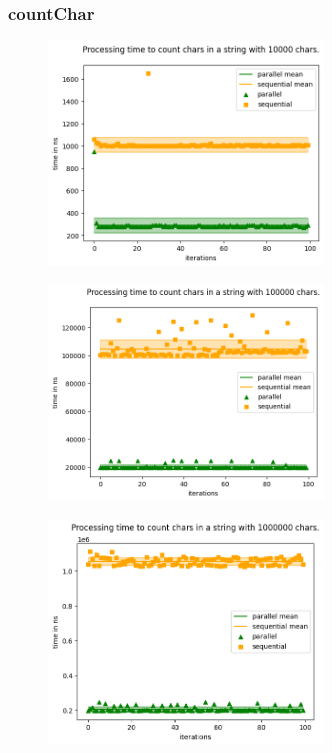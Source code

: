 \documentclass[plainarticle,zihtitle,german,final,hyperref,utf8]{zihpub}
\begin{document}
\subsubsection{countChar}
\begin{figure}[h]
	\begin{center}
		\includegraphics[width=0.65\textwidth]{images/comp_count_10000.png}
	\end{center}
\end{figure}
\begin{figure}[h]
	\begin{center}
		\includegraphics[width=0.65\textwidth]{images/comp_count_100000.png}
	\end{center}
\end{figure}
\begin{figure}[h]
	\begin{center}
		\includegraphics[width=0.65\textwidth]{images/comp_count_1000000.png}
	\end{center}
\end{figure}
\end{document}
